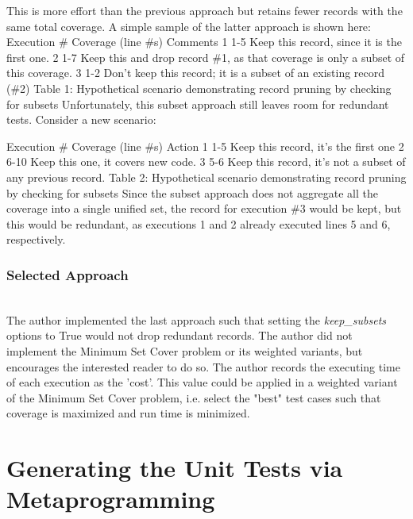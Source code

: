 This is more effort than the previous approach but retains fewer records 
with the same total coverage.  A simple sample of the latter approach is shown here:
Execution \#
Coverage 
(line \#s)
Comments
1
1-5
Keep this record, since it is the first one.
2
1-7
Keep this and drop record \#1, as that coverage is only a subset of this coverage.
3
1-2
Don’t keep this record; it is a subset of an existing record (\#2)
Table 1: Hypothetical scenario demonstrating record pruning by checking for subsets
Unfortunately, this subset approach still leaves room for redundant tests.  Consider a new scenario:

Execution \#
Coverage 
(line \#s)
Action
1
1-5
Keep this record, it’s the first one
2
6-10
Keep this one, it covers new code.
3
5-6
Keep this record, it’s not a subset of any previous record.
Table 2: Hypothetical scenario demonstrating record pruning by checking for subsets
Since the subset approach does not aggregate all  the coverage into a 
single unified set, the record for execution \#3 would be kept, but this would 
be redundant, as executions 1 and 2 already executed lines 5 and 6, respectively.

\subsubsection{Selected Approach}\label{sec:tuning-2}
\hfill\\

The author implemented the last approach such that setting the \textit{keep\_subsets}
options to True would not drop redundant records.  The author did not implement 
the Minimum Set Cover problem or its weighted variants, but encourages 
the interested reader to do so.  The author records the executing time of each 
execution as the 'cost'. This value could be applied in a weighted 
variant of the Minimum Set Cover problem, i.e. select the "best" test cases
such that coverage is maximized and run time is minimized.
   
\section{Generating the Unit Tests via Metaprogramming}\label{sec:generating-tests}

